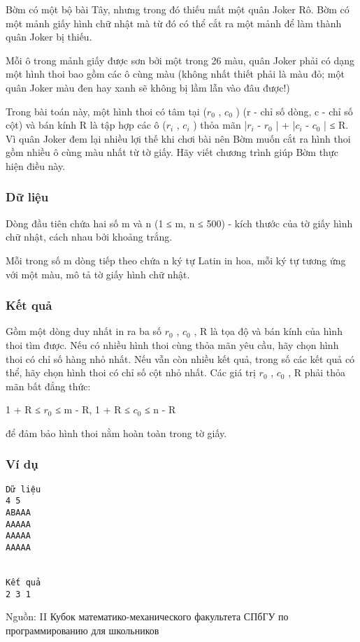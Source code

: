 



   Bờm có một bộ bài Tây, nhưng trong đó thiếu mất một quân Joker Rô. Bờm có một mảnh giấy hình chữ nhật mà từ đó có thể cắt ra một mảnh để làm thành quân Joker bị thiếu.  

   Mỗi ô trong mảnh giấy được sơn bởi một trong 26 màu, quân Joker phải có dạng một hình thoi bao gồm các ô cùng màu (không nhất thiết phải là màu đỏ; một quân Joker màu đen hay xanh sẽ không bị lầm lẫn vào đâu được!)  

   Trong bài toán này, một hình thoi có tâm tại ($r_{0}$   , $c_{0}$   ) (r - chỉ số dòng, c - chỉ số cột) và bán kính R là tập hợp các ô ($r_{i}$   , $c_{i}$   ) thỏa mãn |$r_{i}$   - $r_{0}$   | + |$c_{i}$   - $c_{0}$   | ≤ R. Vì quân Joker đem lại nhiều lợi thế khi chơi bài nên Bờm muốn cắt ra hình thoi gồm nhiều ô cùng màu nhất từ tờ giấy. Hãy viết chương trình giúp Bờm thực hiện điều này.  

\subsubsection{   Dữ liệu  }

   Dòng đầu tiên chứa hai số m và n (1 ≤ m, n ≤ 500) - kích thước của tờ giấy hình chữ nhật, cách nhau bởi khoảng trắng.  

   Mỗi trong số m dòng tiếp theo chứa n ký tự Latin in hoa, mỗi ký tự tương ứng với một màu, mô tả tờ giấy hình chữ nhật.  

\subsubsection{   Kết quả  }

   Gồm một dòng duy nhất in ra ba số $r_{0}$   , $c_{0}$   , R là tọa độ và bán kính của hình thoi tìm được. Nếu có nhiều hình thoi cùng thỏa mãn yêu cầu, hãy chọn hình thoi có chỉ số hàng nhỏ nhất. Nếu vẫn còn nhiều kết quả, trong số các kết quả có thể, hãy chọn hình thoi có chỉ số cột nhỏ nhất. Các giá trị $r_{0}$   , $c_{0}$   , R phải thỏa mãn bất đẳng thức:  

   1 + R ≤ $r_{0}$   ≤ m - R, 1 + R ≤ $c_{0}$   ≤ n - R  

   để đảm bảo hình thoi nằm hoàn toàn trong tờ giấy.  

\subsubsection{   Ví dụ  }
\begin{verbatim}
Dữ liệu
4 5
АВААА
ААААА
ААААА
ААААА


Kết quả
2 3 1
\end{verbatim}

   Nguồn: II Кубок математико-механического факультета СПбГУ по программированию для школьников  
